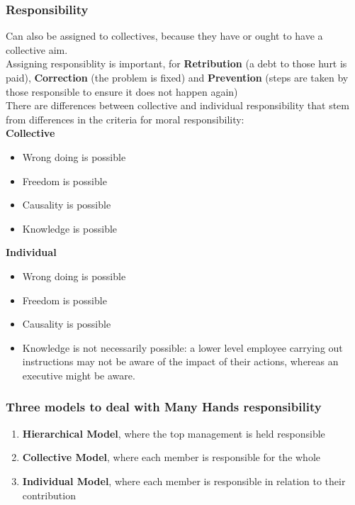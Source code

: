 \documentclass{article}
\begin{document}
        \subsubsection{Responsibility}
        Can also be assigned to collectives, because they have or ought to have a collective aim.
        \\ Assigning responsiblity is important, for \textbf{Retribution} (a debt to those hurt is paid), \textbf{Correction} (the problem is fixed) and \textbf{Prevention} (steps are taken by those responsible to ensure it does not happen again)
        \\There are differences between collective and individual responsibility that stem from differences in the criteria for moral responsibility:
        \\\textbf{Collective}
        \begin{itemize}
            \item Wrong doing is possible
            \item Freedom is possible
            \item Causality is possible
            \item Knowledge is possible
        \end{itemize}
        \bigbreak
        \textbf{Individual}
        \begin{itemize}
            \item Wrong doing is possible
            \item Freedom is possible
            \item Causality is possible
            \item Knowledge is not necessarily possible: a lower level employee carrying out instructions may not be aware of the impact of their actions, whereas an executive might be aware.
        \end{itemize}{}
        
        \subsubsection{Three models to deal with Many Hands responsibility}
        \begin{enumerate}
            \item \textbf{Hierarchical Model}, where the top management is held responsible
            \item \textbf{Collective Model}, where each member is responsible for the whole
            \item \textbf{Individual Model}, where each member is responsible in relation to their contribution
        \end{enumerate}
 
\end{document}
